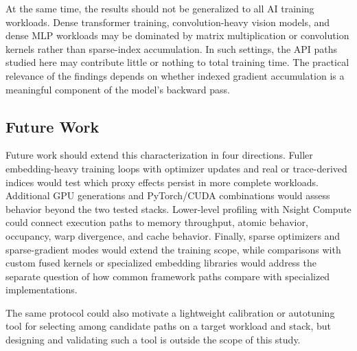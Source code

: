 At the same time, the results should not be generalized to all AI training workloads. Dense transformer training, convolution-heavy vision models, and dense MLP workloads may be dominated by matrix multiplication or convolution kernels rather than sparse-index accumulation. In such settings, the API paths studied here may contribute little or nothing to total training time. The practical relevance of the findings depends on whether indexed gradient accumulation is a meaningful component of the model's backward pass.

\subsection{Future Work}

Future work should extend this characterization in four directions. Fuller embedding-heavy training loops with optimizer updates and real or trace-derived indices would test which proxy effects persist in more complete workloads. Additional GPU generations and PyTorch/CUDA combinations would assess behavior beyond the two tested stacks. Lower-level profiling with Nsight Compute could connect execution paths to memory throughput, atomic behavior, occupancy, warp divergence, and cache behavior. Finally, sparse optimizers and sparse-gradient modes would extend the training scope, while comparisons with custom fused kernels or specialized embedding libraries would address the separate question of how common framework paths compare with specialized implementations.

The same protocol could also motivate a lightweight calibration or autotuning tool for selecting among candidate paths on a target workload and stack, but designing and validating such a tool is outside the scope of this study.
